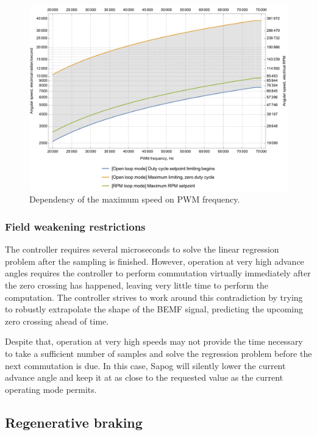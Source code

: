 \documentclass{zubaxdoc}
\begin{document}
\begin{figure}[hbt]
    \centering
	\includegraphics[width=\textwidth]{pwm_maximum_speed}
	\caption{Dependency of the maximum speed on PWM frequency.
	\label{pwm_maximum_speed}}
\end{figure}

\subsubsection{Field weakening restrictions}

The controller requires several microseconds to solve the linear regression problem after the sampling is
finished.
However, operation at very high advance angles requires the controller to perform commutation virtually
immediately after the zero crossing has happened, leaving very little time to perform the computation.
The controller strives to work around this contradiction by trying to robustly extrapolate the shape of the
BEMF signal, predicting the upcoming zero crossing ahead of time.

Despite that, operation at very high speeds may not provide the time necessary to take a sufficient
number of samples and solve the regression problem before the next commutation is due.
In this case, Sapog will silently lower the current advance angle and keep it at as close to the requested
value as the current operating mode permits.

\subsection{Regenerative braking}
\end{document}

